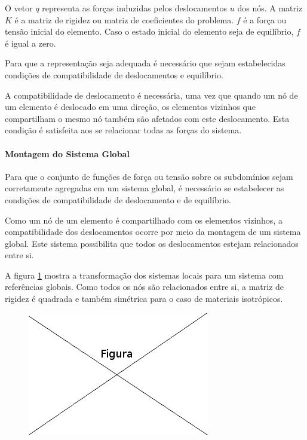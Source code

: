  O vetor $q$ representa as forças induzidas pelos deslocamentos $u$ dos nós. A matriz $K$ é a matriz de rigidez ou matriz de coeficientes do problema. $f$ é a força ou tensão inicial do elemento. Caso o estado inicial do elemento seja de equilíbrio, $f$ é igual a zero.
 
 Para que a representação seja adequada é necessário que sejam estabelecidas condições de compatibilidade de deslocamentos e equilíbrio.
 
 A compatibilidade de deslocamento é necessária, uma vez que quando um nó de um elemento é deslocado em uma direção, os elementos vizinhos que compartilham o mesmo nó também são afetados com este deslocamento. Esta condição é satisfeita aos se relacionar todas as forças do sistema.
 
 \paragraph{Montagem do Sistema Global}
 
 Para que o conjunto de funções de força ou tensão sobre os subdomínios sejam corretamente agregadas em um sistema global, é necessário se estabelecer as condições de compatibilidade de deslocamento e de equilíbrio.
 
 Como um nó de um elemento é compartilhado com os elementos vizinhos, a compatibilidade dos deslocamentos ocorre por meio da montagem de um sistema global. Este sistema possibilita que todos os deslocamentos estejam relacionados entre si.
 
  A figura \ref{fig:loc2glob} mostra a transformação dos sistemas locais para um sistema com referências globais. Como todos os nós são relacionados entre si, a matriz de rigidez é quadrada e também simétrica para o caso de materiais isotrópicos.
  
  \begin{figure}[!htb]
  \centering
  \includegraphics[scale=0.5]{figuras/temp.png}
  \caption{}
  \label{fig:loc2glob}
  \end{figure}
  
